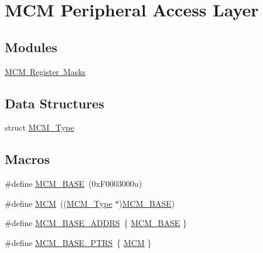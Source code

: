 \hypertarget{group___m_c_m___peripheral___access___layer}{}\section{M\+CM Peripheral Access Layer}
\label{group___m_c_m___peripheral___access___layer}
\subsection*{Modules}
\begin{DoxyCompactItemize}
\item 
\mbox{\hyperlink{group___m_c_m___register___masks}{M\+C\+M Register Masks}}
\end{DoxyCompactItemize}
\subsection*{Data Structures}
\begin{DoxyCompactItemize}
\item 
struct \mbox{\hyperlink{struct_m_c_m___type}{M\+C\+M\+\_\+\+Type}}
\end{DoxyCompactItemize}
\subsection*{Macros}
\begin{DoxyCompactItemize}
\item 
\#define \mbox{\hyperlink{group___m_c_m___peripheral___access___layer_ga84250d5694181f040a437d9125af3fac}{M\+C\+M\+\_\+\+B\+A\+SE}}~(0x\+F0003000u)
\item 
\#define \mbox{\hyperlink{group___m_c_m___peripheral___access___layer_ga4cd2dcee5e786e36844ed653cfa40096}{M\+CM}}~((\mbox{\hyperlink{struct_m_c_m___type}{M\+C\+M\+\_\+\+Type}} $\ast$)\mbox{\hyperlink{group___m_c_m___peripheral___access___layer_ga84250d5694181f040a437d9125af3fac}{M\+C\+M\+\_\+\+B\+A\+SE}})
\item 
\#define \mbox{\hyperlink{group___m_c_m___peripheral___access___layer_ga240172b40ddf9d12c884fb331539f5e9}{M\+C\+M\+\_\+\+B\+A\+S\+E\+\_\+\+A\+D\+D\+RS}}~\{ \mbox{\hyperlink{group___m_c_m___peripheral___access___layer_ga84250d5694181f040a437d9125af3fac}{M\+C\+M\+\_\+\+B\+A\+SE}} \}
\item 
\#define \mbox{\hyperlink{group___m_c_m___peripheral___access___layer_gae2d5e838ce7d2d4108738c05bf224272}{M\+C\+M\+\_\+\+B\+A\+S\+E\+\_\+\+P\+T\+RS}}~\{ \mbox{\hyperlink{group___m_c_m___peripheral___access___layer_ga4cd2dcee5e786e36844ed653cfa40096}{M\+CM}} \}
\end{DoxyCompactItemize}


